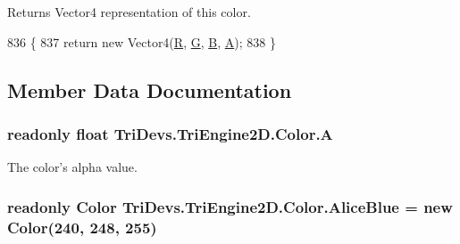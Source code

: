 \begin{DoxyReturn}{Returns}
Vector4 representation of this color.
\end{DoxyReturn}

\begin{DoxyCode}
836         \{
837             \textcolor{keywordflow}{return} \textcolor{keyword}{new} Vector4(\hyperlink{struct_tri_devs_1_1_tri_engine2_d_1_1_color_a1e20afa7351aa10c5ab4bfafcaeca021}{R}, \hyperlink{struct_tri_devs_1_1_tri_engine2_d_1_1_color_af8dd846268b6f84ba3f0ac0c8d26aa61}{G}, \hyperlink{struct_tri_devs_1_1_tri_engine2_d_1_1_color_afa0a5303b8b93c319df33909f9361e6f}{B}, \hyperlink{struct_tri_devs_1_1_tri_engine2_d_1_1_color_a007b76380dbfbb6ac2be76b45e3933e8}{A});
838         \}
\end{DoxyCode}


\subsection{Member Data Documentation}
\hypertarget{struct_tri_devs_1_1_tri_engine2_d_1_1_color_a007b76380dbfbb6ac2be76b45e3933e8}{
\subsubsection[{A}]{\setlength{\rightskip}{0pt plus 5cm}readonly float Tri\-Devs.\-Tri\-Engine2\-D.\-Color.\-A}}\label{struct_tri_devs_1_1_tri_engine2_d_1_1_color_a007b76380dbfbb6ac2be76b45e3933e8}


The color's alpha value. 

\hypertarget{struct_tri_devs_1_1_tri_engine2_d_1_1_color_a9b4d45690414a616d32de81bcc58d40e}{
\subsubsection[{Alice\-Blue}]{\setlength{\rightskip}{0pt plus 5cm}readonly {\bf Color} Tri\-Devs.\-Tri\-Engine2\-D.\-Color.\-Alice\-Blue = new {\bf Color}(240, 248, 255)\hspace{0.3cm}{\ttfamily [static]}}}\label{struct_tri_devs_1_1_tri_engine2_d_1_1_color_a9b4d45690414a616d32de81bcc58d40e}


